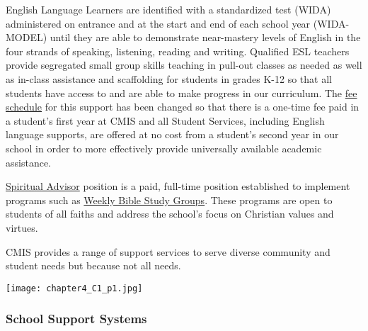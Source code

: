\begin{findings}
English Language Learners are identified with a standardized test (WIDA) administered on entrance and at the start and end of each school year (WIDA-MODEL) until they are able to demonstrate near-mastery levels of English in the four strands of speaking, listening, reading and writing.  Qualified ESL teachers provide segregated small group skills teaching in pull-out classes as needed as well as in-class assistance and scaffolding for students in grades K-12 so that all students have access to and are able to make progress in our curriculum. The \href{https://docs.google.com/document/d/1j2Z1tLgRgfX9CH3dzoYtU_GOhPOVWKPl6iFlvWqd6wM/edit}{fee schedule} for this support has been changed so that there is a one-time fee paid in a student’s first year at CMIS and all Student Services, including English language supports, are offered at no cost from a student’s second year in our school in order to more effectively provide universally available academic assistance. 

\href{http://blogs.cmis.ac.th/eagles/faith-service/spiritual-life/}{Spiritual Advisor} position is a paid, full-time position established to implement programs such as \href{http://blogs.cmis.ac.th/eagles/faith-service/spiritual-life/}{Weekly Bible Study Groups}. These programs are open to students of all faiths and address the school’s focus on Christian values and virtues.


CMIS provides a range of support services to serve diverse community and student needs but because not all needs.
\end{findings}

{\centering\texttt{[image: chapter4\_C1\_p1.jpg]}}

\subsubsection{School Support Systems}



